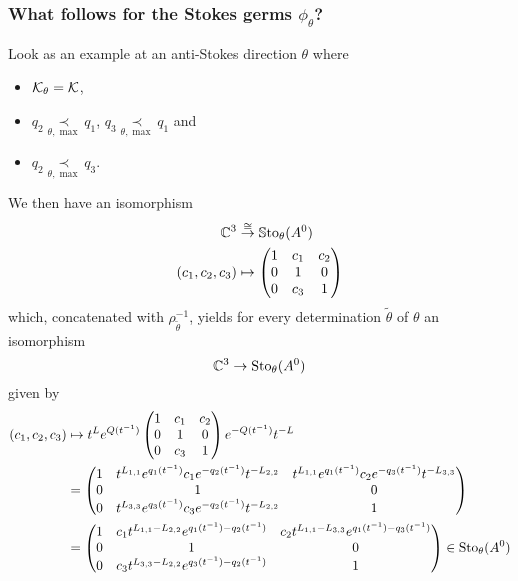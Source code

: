 \subsubsection{What follows for the Stokes germs $\phi_\theta$?}
Look as an example at an anti-Stokes direction $\theta$ where
\begin{itemize}
  \item $\mathcal{K}_{\theta}=\mathcal{K}$,
  \item $q_2 \underset{\theta,\max}{\prec} q_1$,
    $q_3 \underset{\theta,\max}{\prec} q_1$ and
  \item $q_2 \underset{\theta,\max}{\prec} q_3$.
\end{itemize}
We then have an isomorphism
\begin{align*}
  \mathbb{C}^3 &\overset\cong\to \operatorname{\mathbb{S}to}_\theta(A^0)
\\(c_1,c_2,c_3) &\mapsto
  \begin{pmatrix}
    1     & c_1 & c_2
  \\0     & 1     & 0
  \\0     & c_3 & 1
  \end{pmatrix}
\end{align*}
which, concatenated with $\rho_{\tilde\theta}^{-1}$, yields for every
determination $\tilde\theta$ of $\theta$ an isomorphism
\[
  \mathbb{C}^3\to\operatorname{Sto}_\theta(A^0)
\]
given by
\begin{align*}
  (c_1,c_2,c_3) &\mapsto
  t^{L}e^{Q(t^{-1})}
  \begin{pmatrix}
    1     & c_1 & c_2
  \\0     & 1     & 0
  \\0     & c_3 & 1
  \end{pmatrix}
  e^{-Q(t^{-1})}t^{-L}
\\&=
  \begin{pmatrix}
    1
    & t^{L_{1,1}}e^{q_1(t^{-1})}c_1 e^{-q_2(t^{-1})}t^{-L_{2,2}}
    & t^{L_{1,1}}e^{q_1(t^{-1})}c_2 e^{-q_3(t^{-1})}t^{-L_{3,3}}
    \\0     & 1     & 0
    \\0
    & t^{L_{3,3}}e^{q_3(t^{-1})}c_3 e^{-q_2(t^{-1})}t^{-L_{2,2}}
    & 1
  \end{pmatrix}
\\&=
  \begin{pmatrix}
    1
    & c_1 t^{L_{1,1}-L_{2,2}}e^{q_1(t^{-1})-q_2(t^{-1})}
    & c_2 t^{L_{1,1}-L_{3,3}}e^{q_1(t^{-1})-q_3(t^{-1})}
    \\0     & 1     & 0
    \\0
    & c_3 t^{L_{3,3}-L_{2,2}}e^{q_3(t^{-1})-q_2(t^{-1})}
    & 1
  \end{pmatrix}
  \in\operatorname{Sto}_\theta(A^0)
\end{align*}

